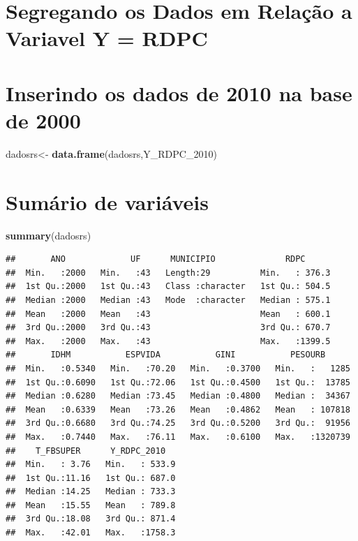 \documentclass[]{article}
\newenvironment{Shaded}{\begin{snugshade}}{\end{snugshade}}
\newcommand{\KeywordTok}[1]{\textcolor[rgb]{0.13,0.29,0.53}{\textbf{#1}}}
\newcommand{\DecValTok}[1]{\textcolor[rgb]{0.00,0.00,0.81}{#1}}
\newcommand{\StringTok}[1]{\textcolor[rgb]{0.31,0.60,0.02}{#1}}
\newcommand{\OperatorTok}[1]{\textcolor[rgb]{0.81,0.36,0.00}{\textbf{#1}}}
\newcommand{\NormalTok}[1]{#1}
\begin{document}
\section{Segregando os Dados em Relação a Variavel Y =
RDPC}\label{segregando-os-dados-em-relacao-a-variavel-y-rdpc}

\begin{Shaded}
\end{Shaded}

\section{Inserindo os dados de 2010 na base de
2000}\label{inserindo-os-dados-de-2010-na-base-de-2000}

\begin{Shaded}
\begin{Highlighting}[]
\NormalTok{dadosrs<-}\StringTok{ }\KeywordTok{data.frame}\NormalTok{(dadosrs,Y_RDPC_}\DecValTok{2010}\NormalTok{)}
\end{Highlighting}
\end{Shaded}

\section{Sumário de variáveis}\label{sumario-de-variaveis}

\begin{Shaded}
\begin{Highlighting}[]
\KeywordTok{summary}\NormalTok{(dadosrs)}
\end{Highlighting}
\end{Shaded}

\begin{verbatim}
##       ANO             UF      MUNICIPIO              RDPC       
##  Min.   :2000   Min.   :43   Length:29          Min.   : 376.3  
##  1st Qu.:2000   1st Qu.:43   Class :character   1st Qu.: 504.5  
##  Median :2000   Median :43   Mode  :character   Median : 575.1  
##  Mean   :2000   Mean   :43                      Mean   : 600.1  
##  3rd Qu.:2000   3rd Qu.:43                      3rd Qu.: 670.7  
##  Max.   :2000   Max.   :43                      Max.   :1399.5  
##       IDHM           ESPVIDA           GINI           PESOURB       
##  Min.   :0.5340   Min.   :70.20   Min.   :0.3700   Min.   :   1285  
##  1st Qu.:0.6090   1st Qu.:72.06   1st Qu.:0.4500   1st Qu.:  13785  
##  Median :0.6280   Median :73.45   Median :0.4800   Median :  34367  
##  Mean   :0.6339   Mean   :73.26   Mean   :0.4862   Mean   : 107818  
##  3rd Qu.:0.6680   3rd Qu.:74.25   3rd Qu.:0.5200   3rd Qu.:  91956  
##  Max.   :0.7440   Max.   :76.11   Max.   :0.6100   Max.   :1320739  
##    T_FBSUPER      Y_RDPC_2010    
##  Min.   : 3.76   Min.   : 533.9  
##  1st Qu.:11.16   1st Qu.: 687.0  
##  Median :14.25   Median : 733.3  
##  Mean   :15.55   Mean   : 789.8  
##  3rd Qu.:18.08   3rd Qu.: 871.4  
##  Max.   :42.01   Max.   :1758.3
\end{verbatim}
\end{document}
